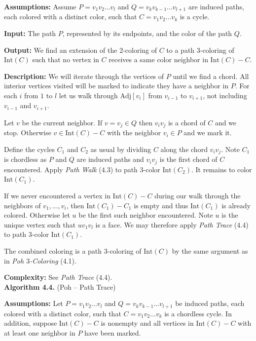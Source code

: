 \documentclass[letterpaper, 12pt]{article}
\theoremstyle{definition}
\theoremstyle{definition}
\theoremstyle{thm}
\theoremstyle{definition}
\begin{document}
\noindent\textbf{Assumptions:} Assume $P=v_1v_2\ldots v_l$ and
$Q=v_kv_{k-1}\ldots v_{l+1}$ are induced paths, each colored with a distinct
color, such that $C=v_1v_2\ldots v_k$ is a cycle.

\noindent\textbf{Input:} The path $P$, represented by its endpoints, and the
color of the path $Q$.

\noindent\textbf{Output:} We find an extension of the $2$-coloring of $C$ to
a path $3$-coloring of $\text{Int}(C)$ such that
no vertex in $C$ receives a same color neighbor in $\text{Int}(C)-C$.

\noindent\textbf{Description:} 
We will iterate through the vertices of $P$ until we find a chord. All interior
vertices visited will be marked to indicate they have a neighbor in $P$. For
each $i$ from $1$ to $l$ let us walk through
$\text{Adj}[v_i]$ from $v_{i-1}$ to $v_{i+1}$, not including
$v_{i-1}$ and $v_{i+1}$.

Let $v$ be the current neighbor. If $v=v_j\in Q$ then $v_iv_j$ is a chord of $C$
and we stop. Otherwise $v\in \text{Int}(C)-C$ with the neighbor $v_i\in P$ and we
mark it.

Define the cycles $C_1$ and $C_2$ as usual by dividing $C$ along the chord
$v_iv_j$. Note $C_1$ is chordless as $P$ and $Q$ are induced paths
and $v_iv_j$ is the first chord of $C$ encountered. Apply \textit{Path Walk}
(4.3) to path $3$-color $\text{Int}(C_2)$. It remains to color
$\text{Int}(C_1)$.

If we never encountered a vertex in $\text{Int}(C)-C$ during our walk through
the neighbors of $v_1,\ldots,v_i$, then $\text{Int}(C_1)-C_1$ is empty and thus
$\text{Int}(C_1)$ is already colored. Otherwise let $u$ be the first such
neighbor encountered. Note $u$ is the unique vertex
such that $uv_1v_l$ is a face. We may therefore apply \textit{Path Trace} (4.4)
to path $3$-color $\text{Int}(C_1)$.

The combined coloring is a path $3$-coloring of $\text{Int}(C)$ by the
same argument as in \textit{Poh $3$-Coloring} (4.1).

\noindent\textbf{Complexity:} See \textit{Path Trace} (4.4).\\

\noindent\textbf{Algorithm 4.4.} (Poh -- Path Trace)

\noindent\textbf{Assumptions:} Let $P=v_1v_2\ldots v_l$ and
$Q=v_kv_{k-1}\ldots v_{l+1}$ be induced paths, each colored with a distinct
color, such that $C=v_1v_2\ldots v_k$ is a chordless cycle. In
addition, suppose $\text{Int}(C)-C$ is nonempty and all vertices in
$\text{Int}(C)- C$ with at least one neighbor in $P$ have been marked.
\end{document}
